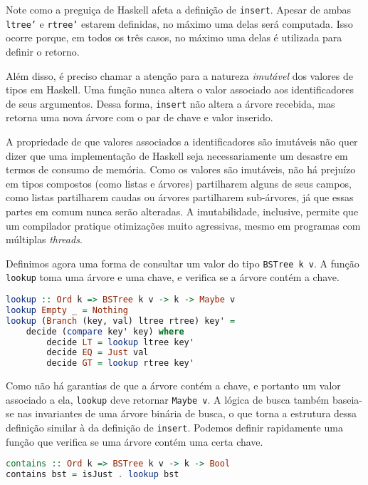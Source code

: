 \documentclass[a4paper]{article}
\begin{document}
Note como a preguiça de Haskell afeta a definição de \texttt{insert}.
Apesar de ambas \texttt{ltree'} e \texttt{rtree'} estarem definidas, no máximo uma delas será computada.
Isso ocorre porque, em todos os três casos, no máximo uma delas é utilizada para definir o retorno.

Além disso, é preciso chamar a atenção para a natureza \emph{imutável} dos valores de tipos em Haskell.
Uma função nunca altera o valor associado aos identificadores de seus argumentos.
Dessa forma, \texttt{insert} não altera a árvore recebida, mas retorna uma nova árvore com o par de chave e valor inserido.

A propriedade de que valores associados a identificadores são imutáveis não quer dizer que uma implementação de Haskell seja necessariamente um desastre em termos de consumo de memória.
Como os valores são imutáveis, não há prejuízo em tipos compostos (como listas e árvores) partilharem alguns de seus campos, como listas partilharem caudas ou árvores partilharem sub-árvores, já que essas partes em comum nunca serão alteradas.
A imutabilidade, inclusive, permite que um compilador pratique otimizações muito agressivas, mesmo em programas com múltiplas \emph{threads}.

Definimos agora uma forma de consultar um valor do tipo \texttt{BSTree k v}.
A função \texttt{lookup} toma uma árvore e uma chave, e verifica se a árvore contém a chave.

\pagebreak

\begin{lstlisting}[language=haskell, frame=single]
lookup :: Ord k => BSTree k v -> k -> Maybe v
lookup Empty _ = Nothing
lookup (Branch (key, val) ltree rtree) key' =
	decide (compare key' key) where
		decide LT = lookup ltree key'
		decide EQ = Just val
		decide GT = lookup rtree key'
\end{lstlisting}

Como não há garantias de que a árvore contém a chave, e portanto um valor associado a ela, \texttt{lookup} deve retornar \texttt{Maybe v}.
A lógica de busca também baseia-se nas invariantes de uma árvore binária de busca, o que torna a estrutura dessa definição similar à da definição de \texttt{insert}.
Podemos definir rapidamente uma função que verifica se uma árvore contém uma certa chave.

\begin{lstlisting}[language=haskell, frame=single]
contains :: Ord k => BSTree k v -> k -> Bool
contains bst = isJust . lookup bst
\end{lstlisting}
\end{document}

